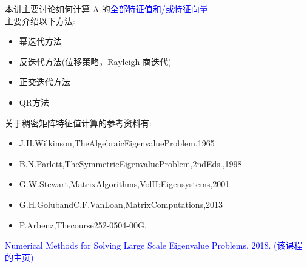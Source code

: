 \documentclass[12pt,a4paper]{article}
\begin{document}
本讲主要讨论如何计算 A 的\textcolor{blue}{全部特征值和/或特征向量}\\
主要介绍以下方法:\\
\begin{itemize}
	\item 幂迭代方法
	\item  反迭代方法(位移策略，Rayleigh 商迭代) \item 正交迭代方法
	\item QR方法
\end{itemize}
关于稠密矩阵特征值计算的参考资料有:\\
\begin{itemize}
	\item J.H.Wilkinson,TheAlgebraicEigenvalueProblem,1965
	\item B.N.Parlett,TheSymmetricEigenvalueProblem,2ndEds.,1998
	\item G.W.Stewart,MatrixAlgorithms,VolII:Eigensystems,2001
	\item G.H.GolubandC.F.VanLoan,MatrixComputations,2013
	\item P.Arbenz,Thecourse252-0504-00G,
\end{itemize}
\textcolor{blue}{Numerical Methods for Solving Large Scale Eigenvalue Problems, 2018.
	(该课程的主页)}
\end{document}
